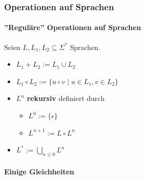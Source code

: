 \documentclass{scrartcl}
\begin{document}
\subsubsection{Operationen auf Sprachen}

\paragraph{''Reguläre'' Operationen auf Sprachen}

Seien $L, L_1, L_2 \subseteq \Sigma^*$ Sprachen.

\begin{itemize}
	\item $L_1 + L_2 := L_1 \cup L_2$
	\item $L_1 \circ L_2 := \{ u \circ v \mid u \in L_1, v \in L_2 \}$
	\item $L^n$ \textbf{rekursiv} definiert durch
	\begin{itemize}
		\item $L^0 := \{ \epsilon \}$
		\item $L^{n+1} := L \circ L^n$
	\end{itemize}
	\item $L^* := \bigcup_{n \leq 0} L^n$
\end{itemize}

\paragraph{Einige Gleichheiten}
\end{document}
